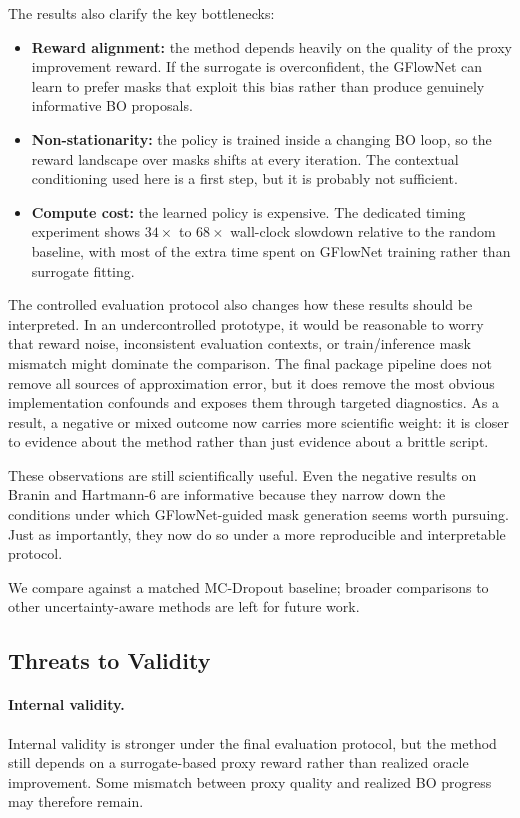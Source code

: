 \documentclass{article}
\begin{document}
The results also clarify the key bottlenecks:

\begin{itemize}
    \item \textbf{Reward alignment:} the method depends heavily on the quality of the proxy improvement reward. If the surrogate is overconfident, the GFlowNet can learn to prefer masks that exploit this bias rather than produce genuinely informative BO proposals.
    \item \textbf{Non-stationarity:} the policy is trained inside a changing BO loop, so the reward landscape over masks shifts at every iteration. The contextual conditioning used here is a first step, but it is probably not sufficient.
    \item \textbf{Compute cost:} the learned policy is expensive. The dedicated timing experiment shows $34\times$ to $68\times$ wall-clock slowdown relative to the random baseline, with most of the extra time spent on GFlowNet training rather than surrogate fitting.
\end{itemize}

The controlled evaluation protocol also changes how these results should be interpreted. In an undercontrolled prototype, it would be reasonable to worry that reward noise, inconsistent evaluation contexts, or train/inference mask mismatch might dominate the comparison. The final package pipeline does not remove all sources of approximation error, but it does remove the most obvious implementation confounds and exposes them through targeted diagnostics. As a result, a negative or mixed outcome now carries more scientific weight: it is closer to evidence about the method rather than just evidence about a brittle script.

These observations are still scientifically useful. Even the negative results on Branin and Hartmann-6 are informative because they narrow down the conditions under which GFlowNet-guided mask generation seems worth pursuing. Just as importantly, they now do so under a more reproducible and interpretable protocol.

We compare against a matched MC-Dropout baseline; broader comparisons to other uncertainty-aware methods are left for future work.

\subsection{Threats to Validity}

\paragraph{Internal validity.} Internal validity is stronger under the final evaluation protocol, but the method still depends on a surrogate-based proxy reward rather than realized oracle improvement. Some mismatch between proxy quality and realized BO progress may therefore remain.
\end{document}
